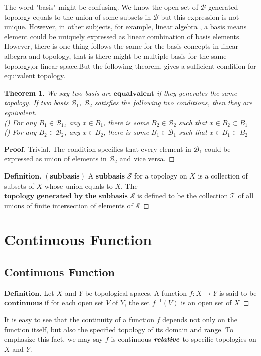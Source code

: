 \documentclass[a4paper, 11pt]{article}
\newtheorem{theorem}{Theorem}
\theoremstyle{definition}
\theoremstyle{remark}
\newenvironment{myprf}
{\renewcommand\qedsymbol{$ $}\begin{proof}[$\mathbf{Proof}$]}
  {\end{proof}}
\newenvironment{mydef}
{\renewcommand\qedsymbol{$ $}\begin{proof}[$\mathbf{Definition}$]}
  {\end{proof}}
\theoremstyle{definition}
\begin{document}
\indent The word "basis" might be confusing. We know the open set of $\mathcal{B}$-generated topology equals to the union of some subsets in $\mathcal{B}$ but this
expression is not unique. However, in other subjects, for example, linear algebra
,  a basis means element could be uniquely expressed as linear combination of basis elements.\\
\indent
However, there is one thing follows the same for the basis concepts in linear 
albegra and topology, that is there might be multiple basis for the same topology,or linear space.But the following theorem, gives a sufficient condition for 
equivalent topology.
\vspace{0.5cm}
\begin{theorem}
        We say two basis are $\textbf{equalvalent}$ if they generates the same
        topology. If two basis $\mathcal{B}_1$, $\mathcal{B}_2$ satisfies the 
        following two conditions, then they are equivalent.\\
        () For any $B_1\in \mathcal{B}_1$, any $x\in B_1$, there
        is some $B_2\in \mathcal{B}_2$ such that $x\in B_2\subset B_1$\\
        () For any $B_2\in \mathcal{B}_2$, any $x\in B_2$, there
        is some $B_1\in \mathcal{B}_1$ such that $x\in B_1\subset B_2$\\
\end{theorem}
\begin{myprf}
        Trivial. The condition specifies that every element in $\mathcal{B}_1$ 
        could be expressed as union of elements in $\mathcal{B}_2$ and vice versa.
\end{myprf}
\vspace{0.5cm}
\begin{mydef}$(\textbf{subbasis})$ A $\textbf{subbasis}$ $\mathcal{S}$
        for a topology on $X$
        is a collection of subsets of $X$ whose union equals to $X$. The
        $\textbf{topology generated by the subbasis}$ $\mathcal{S}$ is defined
        to be the collection $\mathcal{T}$ of all unions of finite intersection
        of elements of $\mathcal{S}$
        
\end{mydef}

\section{Continuous Function}
\subsection{Continuous Function}
\begin{mydef}
       Let $X$ and $Y$ be topological spaces. A function $f:X\rightarrow Y$ is
       said to be $\textbf{continuous}$ if for each open set $V$ of $Y$, 
       the set $f^{-1}(V)$ is an open set of $X$
\end{mydef}
It is easy to see that the continuity of a function $f$ depends not only on the
function itself, but also the specified topology of its domain and range. To 
emphasize this fact, we may say $f$ is continuous $\textbf{\textit{relative}}$ to specific topologies on $X$ and $Y$.
\end{document}
